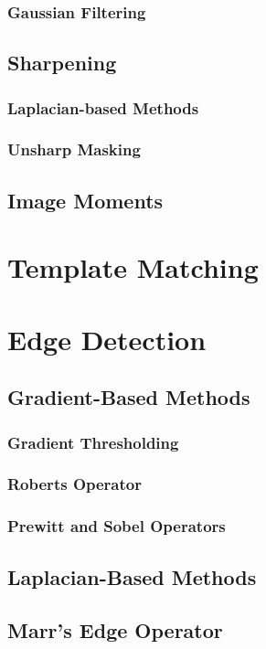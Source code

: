 \documentclass{article}
\begin{document}
\begin{multicols}{2}
\subsubsection{Gaussian Filtering}

\subsection{Sharpening}
\subsubsection{Laplacian-based Methods}
\subsubsection{Unsharp Masking}

\subsection{Image Moments}

\section{Template Matching}

\section{Edge Detection}
\subsection{Gradient-Based Methods}
\subsubsection{Gradient Thresholding}
\subsubsection{Roberts Operator}
\subsubsection{Prewitt and Sobel Operators}
\subsection{Laplacian-Based Methods}
\subsection{Marr's Edge Operator}

\end{multicols}
\end{document}
